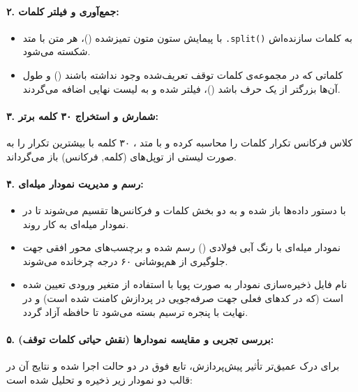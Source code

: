 \documentclass{article}
\begin{document}
    \paragraph{۲. جمع‌آوری و فیلتر کلمات:}
    \begin{itemize}
        \item با پیمایش ستون متون تمیزشده ()، هر متن با متد \texttt{.split()} به کلمات سازنده‌اش شکسته می‌شود.
        \item کلماتی که در مجموعه‌ی کلمات توقف تعریف‌شده وجود نداشته باشند () و طول آن‌ها بزرگتر از یک حرف باشد ()، فیلتر شده و به لیست نهایی اضافه می‌گردند.
    \end{itemize}

    \paragraph{۳. شمارش و استخراج ۳۰ کلمه برتر:}\hspace{-10pt}
    کلاس  فرکانس تکرار کلمات را محاسبه کرده و با متد ، ۳۰ کلمه با بیشترین تکرار را به صورت لیستی از توپل‌های (کلمه, فرکانس) باز می‌گرداند.

    \paragraph{۴. رسم و مدیریت نمودار میله‌ای:}
    \begin{itemize}
        \item با دستور  داده‌ها باز شده و به دو بخش کلمات و فرکانس‌ها تقسیم می‌شوند تا در نمودار میله‌ای به کار روند.
        \item نمودار میله‌ای با رنگ آبی فولادی () رسم شده و برچسب‌های محور افقی جهت جلوگیری از هم‌پوشانی ۶۰ درجه چرخانده می‌شوند.
        \item نام فایل ذخیره‌سازی نمودار به صورت پویا با استفاده از متغیر ورودی  تعیین شده است (که در کدهای فعلی جهت صرفه‌جویی در پردازش کامنت شده است) و در نهایت با  پنجره ترسیم بسته می‌شود تا حافظه آزاد گردد.
    \end{itemize}
\paragraph{۵. بررسی تجربی و مقایسه نمودارها (نقش حیاتی کلمات توقف):}\hspace{-10pt}
    برای درک عمیق‌تر تأثیر پیش‌پردازش، تابع فوق در دو حالت اجرا شده و نتایج آن در قالب دو نمودار زیر ذخیره و تحلیل شده است:
\end{document}
